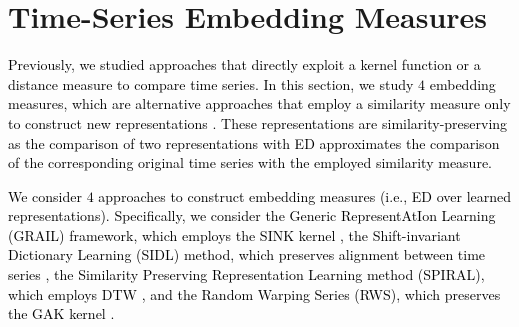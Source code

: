 \documentclass[11pt]{article}
\begin{document}
\section{Time-Series Embedding Measures}
\label{john_sec:embedded}
\textcolor{black}{Previously, we studied approaches that directly exploit a kernel function or a distance measure to compare time series. In this section, we study $4$ embedding measures, which are alternative approaches that employ a similarity measure only to construct new representations \cite{abanda2019review}. These representations are similarity-preserving as the comparison of two representations with ED approximates the comparison of the corresponding original time series with the employed similarity measure.}

\textcolor{black}{We consider $4$ approaches to construct embedding measures (i.e., ED over learned representations). Specifically, we consider the Generic RepresentAtIon Learning (GRAIL) framework, which employs the SINK kernel \cite{paparrizos2019grail}, the Shift-invariant Dictionary Learning (SIDL) method, which preserves alignment between time series \cite{zheng2016efficient}, the Similarity Preserving Representation Learning method (SPIRAL), which employs DTW \cite{lei2017similarity}, and the Random Warping Series (RWS), which preserves the GAK kernel \cite{wu2018random}.}
\end{document}
